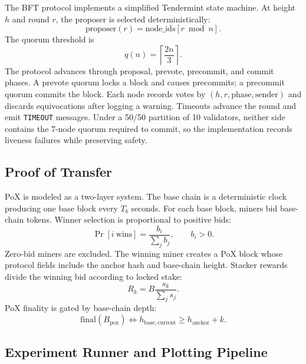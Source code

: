\documentclass[11pt]{article}
\begin{document}
The BFT protocol implements a simplified Tendermint state machine. At height $h$ and round $r$, the proposer is selected deterministically:
\begin{equation}
  \mathrm{proposer}(r) = \mathrm{node\_ids}[r \bmod n].
\end{equation}
The quorum threshold is
\begin{equation}
  q(n) = \left\lceil \frac{2n}{3} \right\rceil.
\end{equation}
The protocol advances through proposal, prevote, precommit, and commit phases. A prevote quorum locks a block and causes precommits; a precommit quorum commits the block. Each node records votes by $(h,r,\mathrm{phase},\mathrm{sender})$ and discards equivocations after logging a warning. Timeouts advance the round and emit \texttt{TIMEOUT} messages. Under a 50/50 partition of 10 validators, neither side contains the 7-node quorum required to commit, so the implementation records liveness failures while preserving safety.

\subsection{Proof of Transfer}

PoX is modeled as a two-layer system. The base chain is a deterministic clock producing one base block every $T_b$ seconds. For each base block, miners bid base-chain tokens. Winner selection is proportional to positive bids:
\begin{equation}
  \Pr[i\ \mathrm{wins}] = \frac{b_i}{\sum_j b_j}, \qquad b_i > 0.
\end{equation}
Zero-bid miners are excluded. The winning miner creates a PoX block whose protocol fields include the anchor hash and base-chain height. Stacker rewards divide the winning bid according to locked stake:
\begin{equation}
  R_k = B \frac{s_k}{\sum_j s_j}.
\end{equation}
PoX finality is gated by base-chain depth:
\begin{equation}
  \mathrm{final}(B_{\mathrm{pox}}) \Leftrightarrow
  h_{\mathrm{base,current}} \geq h_{\mathrm{anchor}} + k.
\end{equation}

\subsection{Experiment Runner and Plotting Pipeline}
\end{document}

